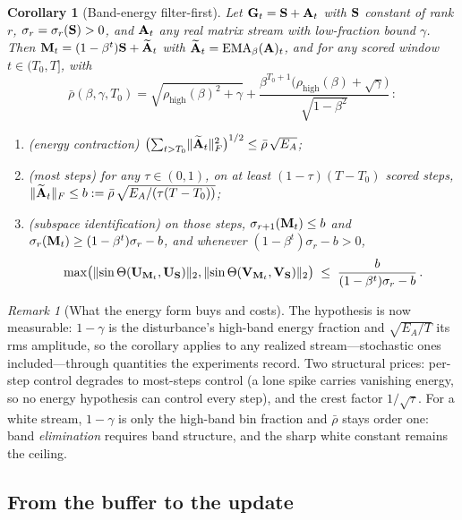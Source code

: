 \documentclass[11pt,a4paper]{article}
\newtheorem{corollary}{Corollary}
\theoremstyle{remark}
\newtheorem{remark}{Remark}
\newcommand{\rhohigh}{\rho_{\mathrm{high}}}
\begin{document}
\begin{corollary}[Band-energy filter-first]
\label{cor:bandenergy}
Let $\mathbf{G}_t=\mathbf{S}+\mathbf{A}_t$ with $\mathbf{S}$ constant of rank $r$, $\sigma_r=\sigma_r(\mathbf{S})>0$, and $\mathbf{A}_t$ any real matrix stream with low-fraction bound $\gamma$.
Then $\mathbf{M}_t=(1-\beta^t)\mathbf{S}+\widetilde{\mathbf{A}}_t$ with $\widetilde{\mathbf{A}}_t=\mathrm{EMA}_\beta(\mathbf{A})_t$, and for any scored window $t\in(T_0,T]$, with
\[
\bar\rho(\beta,\gamma,T_0)=\sqrt{\rhohigh(\beta)^2+\gamma}
+\frac{\beta^{T_0+1}\bigl(\rhohigh(\beta)+\sqrt\gamma\bigr)}{\sqrt{1-\beta^2}}\,:
\]
\begin{enumerate}
\item[(a)] (energy contraction) $\bigl(\sum_{t>T_0}\lVert\widetilde{\mathbf{A}}_t\rVert_F^2\bigr)^{1/2}\le\bar\rho\,\sqrt{E_A}$;
\item[(b)] (most steps) for any $\tau\in(0,1)$, on at least $(1-\tau)(T-T_0)$ scored steps, $\lVert\widetilde{\mathbf{A}}_t\rVert_F\le b:=\bar\rho\,\sqrt{E_A/(\tau(T-T_0))}$;
\item[(c)] (subspace identification) on those steps, $\sigma_{r+1}(\mathbf{M}_t)\le b$ and $\sigma_r(\mathbf{M}_t)\ge(1-\beta^t)\sigma_r-b$, and whenever $(1-\beta^t)\sigma_r-b>0$,
  \[
  \max\bigl(\lVert\sin\Theta(\mathbf{U}_{\mathbf{M}_t},\mathbf{U}_{\mathbf{S}})\rVert_2,\lVert\sin\Theta(\mathbf{V}_{\mathbf{M}_t},\mathbf{V}_{\mathbf{S}})\rVert_2\bigr)
  \;\le\;\frac{b}{(1-\beta^t)\sigma_r-b}\,.
  \]
\end{enumerate}
\end{corollary}

\begin{remark}[What the energy form buys and costs]
\label{rem:bandenergy}
The hypothesis is now measurable: $1-\gamma$ is the disturbance's high-band energy fraction and $\sqrt{E_A/T}$ its rms amplitude, so the corollary applies to any realized stream---stochastic ones included---through quantities the experiments record.
Two structural prices: per-step control degrades to most-steps control (a lone spike carries vanishing energy, so no energy hypothesis can control every step), and the crest factor $1/\sqrt\tau$.
For a white stream, $1-\gamma$ is only the high-band bin fraction and $\bar\rho$ stays order one: band \emph{elimination} requires band structure, and the sharp white constant remains the  ceiling.
\end{remark}

\subsection{From the buffer to the update}
\label{sec:update}
\end{document}
